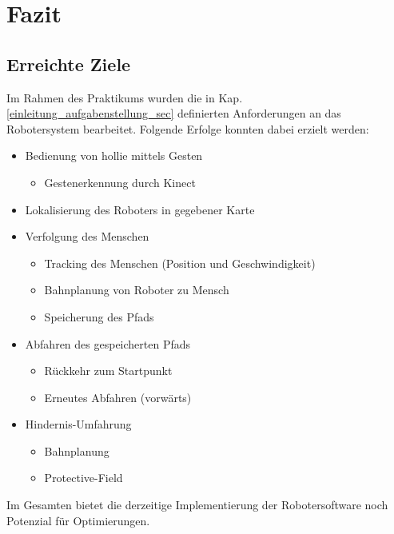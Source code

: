 
\chapter{Fazit}

\section{Erreichte Ziele}
\authorsection{\editorjulian, \editortobias}

Im Rahmen des Praktikums wurden die in Kap. \ref{einleitung_aufgabenstellung_sec} definierten Anforderungen an das Robotersystem bearbeitet.
Folgende Erfolge konnten dabei erzielt werden:

\begin{itemize}
  \item Bedienung von \gls{hollie} mittels Gesten
	\begin{itemize}
	\item Gestenerkennung durch Kinect
	\end{itemize}
  \item Lokalisierung des Roboters in gegebener Karte
  \item Verfolgung des Menschen
	\begin{itemize}
	  \item Tracking des Menschen (Position und Geschwindigkeit)
	  \item Bahnplanung von Roboter zu Mensch
	  \item Speicherung des Pfads
	\end{itemize}
  \item Abfahren des gespeicherten Pfads
	\begin{itemize}
	  \item Rückkehr zum Startpunkt
	  \item Erneutes Abfahren (vorwärts)
	\end{itemize}
  \item Hindernis-Umfahrung
	\begin{itemize}
	  \item Bahnplanung
	  \item Protective-Field
	\end{itemize}
\end{itemize}

Im Gesamten bietet die derzeitige Implementierung der Robotersoftware noch Potenzial für Optimierungen.



